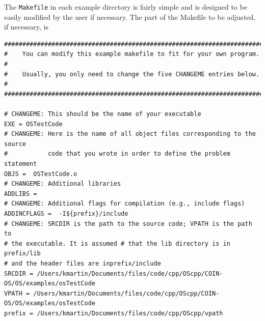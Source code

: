 \documentclass[11pt]{article}
\renewcommand{\_}{{\char"5F}}
\renewcommand{\{}{{\char"7B}}
\renewcommand{\}}{{\char"7D}}
\renewcommand{\^}{{\char"0D}}
\renewcommand{\'}{{\char"0D}}
\begin{document}
\begin{enumerate}[Step 1:]
The {\tt Makefile} in each example directory is fairly simple and is designed to be easily modified by the user 
if necessary.  The part of the Makefile to be adjusted, if necessary, is
%

\begin{verbatim}
##########################################################################
#    You can modify this example makefile to fit for your own program.   #
#    Usually, you only need to change the five CHANGEME entries below.   #
##########################################################################

# CHANGEME: This should be the name of your executable
EXE = OSTestCode
# CHANGEME: Here is the name of all object files corresponding to the source
#           code that you wrote in order to define the problem statement
OBJS =  OSTestCode.o 
# CHANGEME: Additional libraries
ADDLIBS = 
# CHANGEME: Additional flags for compilation (e.g., include flags)
ADDINCFLAGS =  -I${prefix}/include  
# CHANGEME: SRCDIR is the path to the source code; VPATH is the path to
# the executable. It is assumed # that the lib directory is in prefix/lib 
# and the header files are inprefix/include
SRCDIR = /Users/kmartin/Documents/files/code/cpp/OScpp/COIN-OS/OS/examples/osTestCode
VPATH = /Users/kmartin/Documents/files/code/cpp/OScpp/COIN-OS/OS/examples/osTestCode
prefix = /Users/kmartin/Documents/files/code/cpp/OScpp/vpath
\end{verbatim}



\end{enumerate}
\end{document}
